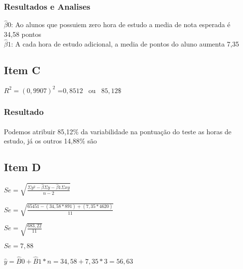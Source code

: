 \documentclass{article}
\begin{document}
            \subsubsection{Resultados e Analises}

            $\hat{\beta}0 $: Ao alunos que possuiem zero hora de estudo
                             a media de nota esperada é 34,58 pontos   \\    
            $\hat{\beta}1 $: A cada hora de estudo adicional, a media de pontos do aluno aumenta 7,35

    \subsection{Item C}
        
            \begin{flushleft}
                $R^2 = (0,9907)^2$ =$0,8512$ \ ou \ $85,12\$$
            \end{flushleft}

            \subsubsection{Resultado}
            \paragraph{}Podemos atribuir 85,12\% da variabilidade na pontuação do teste as horas de estudo, 
            já os outros 14,88\% são 

    \subsection{Item D}
            \begin{flushleft}
            $Se = \sqrt{ \frac{\Sigma y^2 - \hat{\beta } \Sigma y - \hat{\beta}1 \Sigma xy }{n-2}}$
            \end{flushleft}   

            \begin{flushleft}
            $Se = \sqrt{ \frac{65451 - (34,58 * 891)+ (7,35 * 4620) }{11}}$

            $Se = \sqrt{ \frac{683,22}{11}}$

            $Se = 7,88$
            \end{flushleft}   

            \begin{flushleft}
            $\hat{y} = \hat{B}0 + \hat{B}1 *n = 34,58+7,35 * 3=56,63$
            \end{flushleft}   
\end{document}
